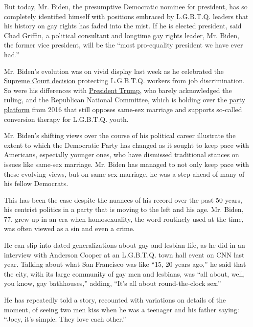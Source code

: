 But today, Mr. Biden, the presumptive Democratic nominee for president,
has so completely identified himself with positions embraced by
L.G.B.T.Q. leaders that his history on gay rights has faded into the
mist. If he is elected president, said Chad Griffin, a political
consultant and longtime gay rights leader, Mr. Biden, the former vice
president, will be the ``most pro-equality president we have ever had.''

Mr. Biden's evolution was on vivid display last week as he celebrated
the
\href{https://www.nytimes3xbfgragh.onion/2020/06/15/us/gay-transgender-workers-supreme-court.html}{Supreme
Court decision} protecting L.G.B.T.Q. workers from job discrimination.
So were his differences with
\href{https://www.nytimes3xbfgragh.onion/interactive/2020/us/elections/donald-trump.html}{President
Trump}, who barely acknowledged the ruling, and the Republican National
Committee, which is holding over the
\href{https://www.nytimes3xbfgragh.onion/2020/06/11/us/politics/republican-platform.html}{party
platform} from 2016 that still opposes same-sex marriage and supports
so-called conversion therapy for L.G.B.T.Q. youth.

Mr. Biden's shifting views over the course of his political career
illustrate the extent to which the Democratic Party has changed as it
sought to keep pace with Americans, especially younger ones, who have
dismissed traditional stances on issues like same-sex marriage. Mr.
Biden has managed to not only keep pace with these evolving views, but
on same-sex marriage, he was a step ahead of many of his fellow
Democrats.

This has been the case despite the nuances of his record over the past
50 years, his centrist politics in a party that is moving to the left
and his age. Mr. Biden, 77, grew up in an era when homosexuality, the
word routinely used at the time, was often viewed as a sin and even a
crime.

He can slip into dated generalizations about gay and lesbian life, as he
did in an interview with Anderson Cooper at an L.G.B.T.Q. town hall
event on CNN last year. Talking about what San Francisco was like ``15,
20 years ago,'' he said that the city, with its large community of gay
men and lesbians, was ``all about, well, you know, gay bathhouses,''
adding, ``It's all about round-the-clock sex.''

He has repeatedly told a story, recounted with variations on details of
the moment, of seeing two men kiss when he was a teenager and his father
saying: ``Joey, it's simple. They love each other.''

